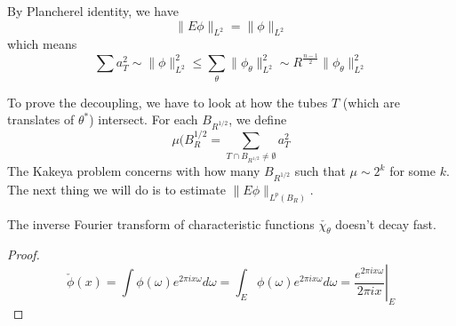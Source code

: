 By Plancherel identity, we have
\begin{equation*}
    \|E\phi\|_{L^2}=\|\phi\|_{L^2}
\end{equation*}
which means
\begin{equation*}
    \sum a_T^2\sim\|\phi\|_{L^2}^2\leq\sum_\theta\|\phi_\theta\|_{L^2}^2\sim R^{\frac{n-1}{2}}\|\phi_\theta\|_{L^2}^2
\end{equation*}

To prove the decoupling, we have to look at how the tubes $T$ (which are translates of $\theta^*$) intersect. For each $B_{R^{1/2}}$, we define
\begin{equation*}
    \mu(B_R^{1/2}=\sum_{T\cap B_{R^{1/2}}\neq\emptyset}a_T^2
\end{equation*}
The Kakeya problem concerns with how many $B_{R^{1/2}}$ such that $\mu\sim 2^k$ for some $k$. The next thing we will do is to estimate $\|E\phi\|_{L^p(B_R)}$.

\begin{proposition}
    The inverse Fourier transform of characteristic functions $\check{\chi_\theta}$ doesn't decay fast. 
\end{proposition}
\begin{proof}
\begin{equation*}
    \check{\phi}(x)=\int\phi(\omega)e^{2\pi ix\omega}d\omega=\int_E\phi(\omega)e^{2\pi ix\omega}d\omega=\left.\frac{e^{2\pi ix\omega}}{2\pi ix}\right\vert_E
\end{equation*}
\end{proof}

